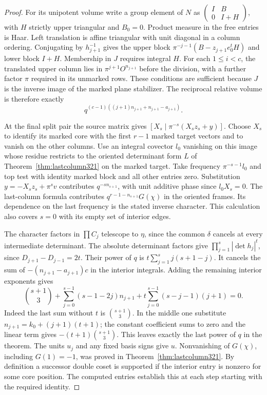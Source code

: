 \documentclass[a4paper,11pt]{article}
\theoremstyle{definition}
\theoremstyle{remark}
\numberwithin{equation}{section}
\begin{document}
\begin{proof}
For its unipotent volume write a group element of \(N\) as
\(\left(\begin{smallmatrix}I&B\\0&I+H\end{smallmatrix}\right)\),
with \(H\) strictly upper triangular and \(B_0=0\).
Product measure in the free entries is Haar. Left translation
is affine triangular with unit diagonal in a column ordering.
Conjugating by \(h_{j+1}^{-1}\) gives the upper block
\(\pi^{-j-1}(B-z_{j+1}e_0^tH)\) and lower block \(I+H\).
Membership in \(J\) requires integral \(H\). For each
\(1\le i<c\), the translated upper column lies in
\(\pi^{j+1}O^{n_{j+1}}\) before the division, with a further
factor \(\pi\) required in its unmarked rows. These conditions
are sufficient because \(J\) is the inverse image of the
marked plane stabilizer. The reciprocal relative volume is
therefore exactly
\[
       q^{(c-1)((j+1)n_{j+1}+n_{j+1}-a_{j+1})}.
\]

At the final split pair the source matrix gives
\([X_s\mid \pi^{-s}(X_s z_s+y)]\). Choose \(X_s\) to
identify its marked core with the first \(r-1\) marked
target vectors and to vanish on the other columns. Use an
integral covector \(l_0\) vanishing on this image whose
residue restricts to the oriented determinant form \(L\)
of Theorem~\ref{thm:lastcolumn321} on the marked target.
Take frequency \(\pi^{-s-1}l_0\) and top test with identity
marked block and all other entries zero. Substitution
\(y=-X_sz_s+\pi^s v\) contributes \(q^{-sn_{s+1}}\), with
unit additive phase since \(l_0X_s=0\). The last-column
formula contributes \(q^{r-1-n_{s+1}}G(\chi)\) in the
oriented frames. Its dependence on the last frequency is
the stated inverse character. This calculation also covers
\(s=0\) with its empty set of interior edges.

The character factors in \(\prod C_j\) telescope to
\(\eta\), since the common \(\delta\) cancels at every
intermediate determinant. The absolute determinant factors
give \(\prod_{j=1}^s|\det h_j|^t\), since
\(D_{j+1}-D_{j-1}=2t\). Their power of \(q\) is
\(t\sum_{j=1}^s j(s+1-j)\). It cancels the sum of
\(-(n_{j+1}-a_{j+1})c\) in the interior integrals.
Adding the remaining interior exponents gives
\[
 \binom{s+1}{3}
  +\sum_{j=0}^{s-1}(s-1-2j)n_{j+1}
  +t\sum_{j=0}^{s-1}(s-j-1)(j+1)=0 .
\]
Indeed the last sum without \(t\) is \(\binom{s+1}{3}\).
In the middle one substitute \(n_{j+1}=k_0+(j+1)(t+1)\);
the constant coefficient sums to zero and the linear term
gives \(-(t+1)\binom{s+1}{3}\). This leaves exactly the
last power of \(q\) in the theorem. The units \(u_j\) and
any fixed basis signs give \(u\). Nonvanishing of \(G(\chi)\),
including \(G(1)=-1\), was proved in
Theorem~\ref{thm:lastcolumn321}. By definition a successor
double coset is supported if the interior entry is nonzero
for some core position. The computed entries establish this
at each step starting with the required identity.
\end{proof}
\end{document}
